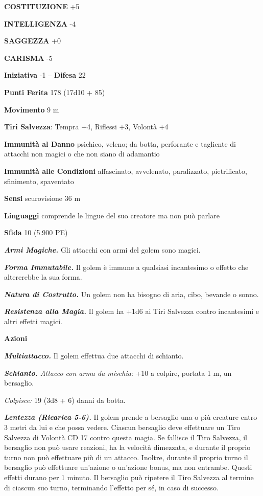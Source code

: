 \begin{multicols}{2}
\textbf{COSTITUZIONE} +5

\textbf{INTELLIGENZA} -4

\textbf{SAGGEZZA} +0

\textbf{CARISMA} -5

\textbf{Iniziativa} -1 -- \textbf{Difesa} 22

\textbf{Punti Ferita} 178 (17d10 + 85)

\textbf{Movimento} 9 m

\textbf{Tiri Salvezza}: Tempra +4, Riflessi +3, Volontà +4

\textbf{Immunità al Danno} psichico, veleno; da botta, perforante e tagliente di attacchi non magici o che non siano di adamantio

\textbf{Immunità alle Condizioni} affascinato, avvelenato, paralizzato, pietrificato, sfinimento, spaventato

\textbf{Sensi} scurovisione 36 m

\textbf{Linguaggi} comprende le lingue del suo creatore ma non può parlare

\textbf{Sfida} 10 (5.900 PE)

\emph{\textbf{Armi Magiche.}} Gli attacchi con armi del golem sono magici.

\emph{\textbf{Forma Immutabile.}} Il golem è immune a qualsiasi incantesimo o effetto che altererebbe la sua forma.

\emph{\textbf{Natura di Costrutto.}} Un golem non ha bisogno di aria, cibo, bevande o sonno.

\emph{\textbf{Resistenza alla Magia.}} Il golem ha +1d6 ai Tiri Salvezza contro incantesimi e altri effetti magici.

\textbf{Azioni}

\emph{\textbf{Multiattacco.}} Il golem effettua due attacchi di schianto.

\emph{\textbf{Schianto.} Attacco con arma da mischia}: +10 a colpire, portata 1 m, un bersaglio.

\emph{Colpisce:} 19 (3d8 + 6) danni da botta.

\emph{\textbf{Lentezza (Ricarica 5-6).}} Il golem prende a bersaglio una o più creature entro 3 metri da lui e che possa vedere. Ciascun bersaglio deve effettuare un Tiro Salvezza di Volontà CD 17 contro questa magia. Se fallisce il Tiro Salvezza, il bersaglio non può usare reazioni, ha la velocità dimezzata, e durante il proprio turno non può effettuare più di un attacco. Inoltre, durante il proprio turno il bersaglio può effettuare un'azione o un'azione bonus, ma non entrambe. Questi effetti durano per 1 minuto. Il bersaglio può ripetere il Tiro Salvezza al termine di ciascun suo turno, terminando l'effetto per sé, in caso di successo.


\end{multicols}
